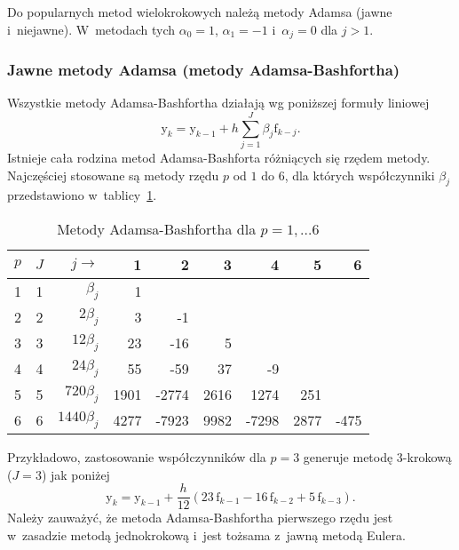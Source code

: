 \documentclass[paper=a4,DIV=12]{lpas}
\newcommand{\brm}[1]{\bm{\mathrm{#1}}}
\begin{document}
\begin{appendices}
Do popularnych metod wielokrokowych należą metody Adamsa (jawne i~niejawne).
W~metodach tych $\alpha_0=1$, $\alpha_1=-1$ i~$\alpha_j = 0$ dla $j > 1$.

\subsubsection{Jawne metody Adamsa (metody Adamsa-Bashfortha)}
\label{sec:JVLO6}

Wszystkie metody Adamsa-Bashfortha działają wg poniższej formuły liniowej
\begin{equation}
  \brm{y}_k = \brm{y}_{k-1} + h \sum_{j=1}^J \beta_j \brm{f}_{k-j}.
  \label{eq:DUQAC}
\end{equation}
Istnieje cała rodzina metod Adamsa-Bashforta różniących się rzędem metody.
Najczęściej stosowane są metody rzędu $p$ od $1$ do $6$, dla których
współczynniki $\beta_j$ przedstawiono w~tablicy~\ref{tab:OWS53}.
\begin{table}[htbp]
  \caption{Metody Adamsa-Bashfortha dla $p=1,\dots6$}
  \label{tab:OWS53}
  \centering
  \begin{tabular}{|c|c|r|r|r|r|r|r|r|}
    \hline
    $p$ & $J$ & $j \rightarrow$ &    1 &    2 &    3 &    4 & 5    & 6    \\ \hline
     1  &  1  &   $\beta_j$     &    1 &      &      &      &      &      \\
     2  &  2  &   $2\beta_j$    &    3 &   -1 &      &      &      &      \\
     3  &  3  &  $12\beta_j$    &   23 &  -16 &    5 &      &      &      \\
     4  &  4  &  $24\beta_j$    &   55 &  -59 &   37 &   -9 &      &      \\
     5  &  5  & $720\beta_j$    & 1901 &-2774 & 2616 & 1274 &  251 &      \\
     6  &  6  &$1440\beta_j$    & 4277 &-7923 & 9982 &-7298 & 2877 & -475 \\ \hline
  \end{tabular}
\end{table}
Przykładowo, zastosowanie współczynników dla $p=3$ generuje metodę 3-krokową
($J=3$) jak poniżej
\begin{equation}
  \brm{y}_{k} =  \brm{y}_{k-1} + \frac{h}{12} \left(23\,\brm{f}_{k-1} - 16\,\brm{f}_{k-2} + 5\,\brm{f}_{k-3} \right).
  \label{eq:IYF96}
\end{equation}
Należy zauważyć, że metoda Adamsa-Bashfortha pierwszego rzędu jest w~zasadzie
metodą jednokrokową i~jest tożsama z~jawną metodą Eulera.



\end{appendices}
\end{document}
